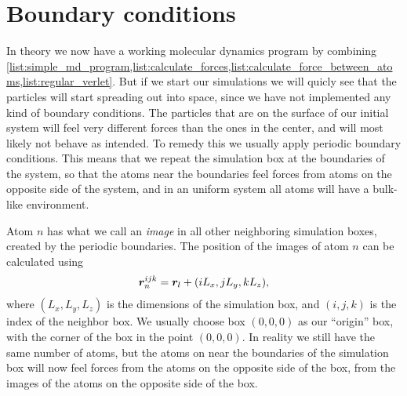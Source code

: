 \section{Boundary conditions}
In theory we now have a working molecular dynamics program by combining \cref{list:simple_md_program,list:calculate_forces,list:calculate_force_between_atoms,list:regular_verlet}. But if we start our simulations we will quicly see that the particles will start spreading out into space, since we have not implemented any kind of boundary conditions. The particles that are on the surface of our initial system will feel very different forces than the ones in the center, and will most likely not behave as intended. To remedy this we usually apply periodic boundary conditions. This means that we repeat the simulation box at the boundaries of the system, so that the atoms near the boundaries feel forces from atoms on the opposite side of the system, and in an uniform system all atoms will have a bulk-like environment. 

Atom $n$ has what we call an \emph{image} in all other neighboring simulation boxes, created by the periodic boundaries. The position of the images of atom $n$ can be calculated using
\begin{align}
    \boldsymbol{r}_n^{ijk} = \boldsymbol{r}_l + (iL_x, jL_y, kL_z),
    \label{eq:pbc_positions}
\end{align}
where $(L_x, L_y, L_z)$ is the dimensions of the simulation box, and $(i, j, k)$ is the index of the neighbor box. We usually choose box $(0,0,0)$ as our ``origin'' box, with the corner of the box in the point $(0,0,0)$. In reality we still have the same number of atoms, but the atoms on near the boundaries of the simulation box will now feel forces from the atoms on the opposite side of the box, from the images of the atoms on the opposite side of the box.

